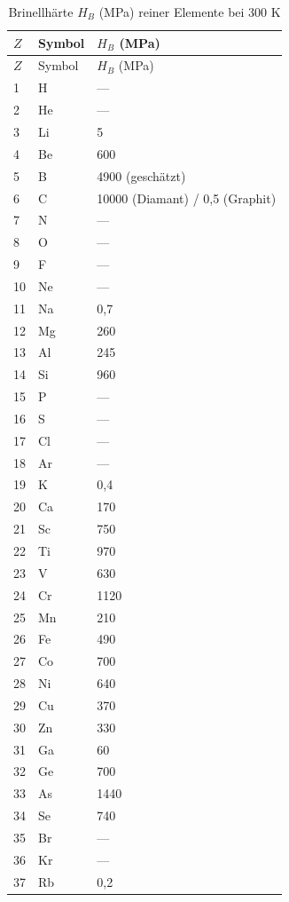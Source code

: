 \documentclass[12pt,a4paper]{article}
\begin{document}
	\begin{longtable}{p{0.6cm}p{1.2cm}p{2.5cm}}
		\caption{Brinellhärte \(H_B\) (MPa) reiner Elemente bei 300 K} \label{tab:hardness-all} \\
		\toprule
		\(Z\) & Symbol & \(H_B\) (MPa) \\
		\midrule
		\endfirsthead
		\toprule
		\(Z\) & Symbol & \(H_B\) (MPa) \\
		\midrule
		\endhead
		1  & H  & — \\
		2  & He & — \\
		3  & Li & 5 \\
		4  & Be & 600 \\
		5  & B  & 4900 (geschätzt) \\
		6  & C  & 10000 (Diamant) / 0,5 (Graphit) \\
		7  & N  & — \\
		8  & O  & — \\
		9  & F  & — \\
		10 & Ne & — \\
		11 & Na & 0,7 \\
		12 & Mg & 260 \\
		13 & Al & 245 \\
		14 & Si & 960 \\
		15 & P  & — \\
		16 & S  & — \\
		17 & Cl & — \\
		18 & Ar & — \\
		19 & K  & 0,4 \\
		20 & Ca & 170 \\
		21 & Sc & 750 \\
		22 & Ti & 970 \\
		23 & V  & 630 \\
		24 & Cr & 1120 \\
		25 & Mn & 210 \\
		26 & Fe & 490 \\
		27 & Co & 700 \\
		28 & Ni & 640 \\
		29 & Cu & 370 \\
		30 & Zn & 330 \\
		31 & Ga & 60 \\
		32 & Ge & 700 \\
		33 & As & 1440 \\
		34 & Se & 740 \\
		35 & Br & — \\
		36 & Kr & — \\
		37 & Rb & 0,2 \\

\end{longtable}
\end{document}
